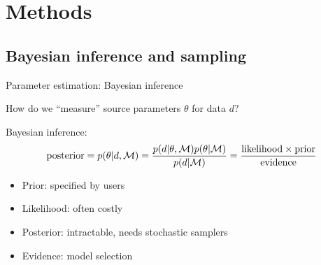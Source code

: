 \documentclass[usenames,dvipsnames,t]{beamer}
\begin{document}
\section{Methods}

\subsection{Bayesian inference and sampling}

\begin{frame}{Parameter estimation: Bayesian inference}

  \def\x{3mm}

  How do we ``measure'' source parameters $\theta$ for data $d$? 

  \vspace{\x}
  
  Bayesian inference:
  \begin{equation*}
    {\rm{posterior}} = p(\theta|d, \mathcal{M}) = \frac{p(d|\theta, \mathcal{M}) p(\theta | \mathcal{M})}{p(d | \mathcal{M})} = \frac{\rm{likelihood} \times \rm{prior}}{\rm{evidence}}
  \end{equation*}

  \begin{itemize}
    \item Prior: specified by users
    
    \item Likelihood: often costly
    
    \item Posterior: intractable, needs stochastic samplers

    \item Evidence: model selection
  \end{itemize}
\end{frame}





\end{document}
